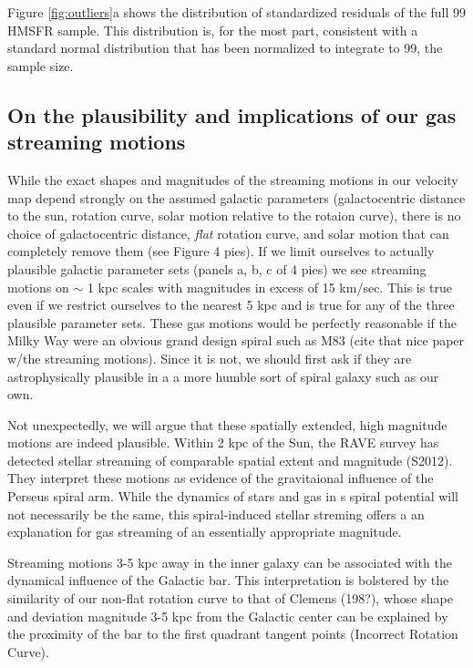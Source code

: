 Figure \ref{fig:outliers}a shows the distribution of standardized residuals of the full 99 HMSFR sample.
This distribution is, for the most part, consistent with a standard normal distribution that has been normalized to integrate to 99, the sample size. 


\subsection{On the plausibility and implications of our gas streaming motions}
While the exact shapes and magnitudes of the streaming motions in our velocity map depend strongly on the assumed galactic parameters (galactocentric distance to the sun, rotation curve, solar motion relative to the rotaion curve), there is no choice of galactocentric distance, \emph{flat} rotation curve, and solar motion that can completely remove them (see Figure 4 pies).
If we limit ourselves to actually plausible galactic parameter sets (panels a, b, c of 4 pies) we see streaming motions on $\sim$ 1 kpc scales with magnitudes in excess of 15 km/sec. 
This is true even if we restrict ourselves to the nearest 5 kpc and is true for any of the three plausible parameter sets. 
These gas motions would be perfectly reasonable if the Milky Way were an obvious grand design spiral such as M83 (cite that nice paper w/the streaming motions). 
Since it is not, we should first ask if they are astrophysically plausible in a a more humble sort of spiral galaxy such as our own. 

Not unexpectedly, we will argue that these spatially extended, high magnitude motions are indeed plausible.
Within 2 kpc of the Sun, the RAVE survey has detected stellar streaming of comparable spatial extent and magnitude (S2012). They interpret these motions as evidence of the gravitaional influence of the Perseus spiral arm.
While the dynamics of stars and gas in s spiral potential will not necessarily be the same, this spiral-induced stellar streming offers a an explanation for gas streaming of an essentially appropriate magnitude.

Streaming motions 3-5 kpc away in the inner galaxy can be associated with the dynamical influence of the Galactic bar. 
This interpretation is bolstered by the similarity of our non-flat rotation curve to that of Clemens (198?), whose shape and deviation magnitude 3-5 kpc from the Galactic center can be explained by the proximity of the bar to the first quadrant tangent points (Incorrect Rotation Curve). 

